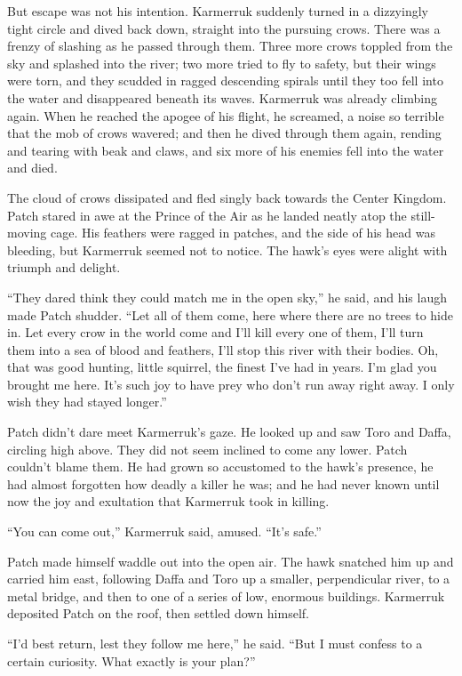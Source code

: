 \documentclass[ebook,oneside,openany,12pt]{memoir}
\begin{document}
But escape was not his intention. Karmerruk suddenly turned in a
dizzyingly tight circle and dived back down, straight into the
pursuing crows. There was a frenzy of slashing as he passed through
them. Three more crows toppled from the sky and splashed into the
river; two more tried to fly to safety, but their wings were torn, and
they scudded in ragged descending spirals until they too fell into the
water and disappeared beneath its waves. Karmerruk was already
climbing again. When he reached the apogee of his flight, he screamed,
a noise so terrible that the mob of crows wavered; and then he dived
through them again, rending and tearing with beak and claws, and six
more of his enemies fell into the water and died.

The cloud of crows dissipated and fled singly back towards the Center
Kingdom. Patch stared in awe at the Prince of the Air as he landed
neatly atop the still-moving cage. His feathers were ragged in
patches, and the side of his head was bleeding, but Karmerruk seemed
not to notice. The hawk’s eyes were alight with triumph and delight.

“They dared think they could match me in the open sky,” he said, and
his laugh made Patch shudder. “Let all of them come, here where there
are no trees to hide in. Let every crow in the world come and I’ll
kill every one of them, I’ll turn them into a sea of blood and
feathers, I’ll stop this river with their bodies. Oh, that was good
hunting, little squirrel, the finest I’ve had in years. I’m glad you
brought me here. It’s such joy to have prey who don’t run away right
away. I only wish they had stayed longer.”

Patch didn’t dare meet Karmerruk’s gaze. He looked up and saw Toro and
Daffa, circling high above. They did not seem inclined to come any
lower. Patch couldn’t blame them. He had grown so accustomed to the
hawk’s presence, he had almost forgotten how deadly a killer he was;
and he had never known until now the joy and exultation that Karmerruk
took in killing.

“You can come out,” Karmerruk said, amused. “It’s safe.”

Patch made himself waddle out into the open air. The hawk snatched him
up and carried him east, following Daffa and Toro up a smaller,
perpendicular river, to a metal bridge, and then to one of a series of
low, enormous buildings. Karmerruk deposited Patch on the roof, then
settled down himself.

“I’d best return, lest they follow me here,” he said. “But I must
confess to a certain curiosity. What exactly is your plan?”
\end{document}
